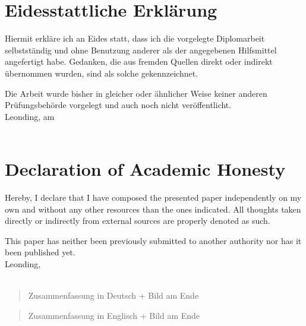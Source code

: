 \section*{Eidesstattliche Erklärung}
Hiermit erkläre ich an Eides statt, dass ich die vorgelegte Diplomarbeit selbstständig und ohne Benutzung anderer als der angegebenen Hilfsmittel angefertigt habe. Gedanken, die aus fremden Quellen direkt oder indirekt übernommen wurden, sind als solche gekennzeichnet.

Die Arbeit wurde bisher in gleicher oder ähnlicher Weise keiner anderen Prüfungsbehörde vorgelegt und auch noch nicht veröffentlicht. \\[1em]
Leonding, am \duedatede \\[5em]
\ifthenelse{\isundefined{\firstauthor}}{}{\firstauthor}
\ifthenelse{\isundefined{\secondauthor}}{}{\kern-1ex, \secondauthor}
\ifthenelse{\isundefined{\thirdauthor}}{}{\kern-1ex, \thirdauthor}
\ifthenelse{\isundefined{\fourthauthor}}{}{\kern-1ex, \fourthauthor} \\[5em]

\section*{Declaration of Academic Honesty}
Hereby, I declare that I have composed the presented paper independently on my own and without any other resources than the ones indicated. All thoughts taken directly or indirectly from external sources are properly denoted as such.

This paper has neither been previously submitted to another authority nor has it been published yet. \\[1em]
Leonding, \duedateen \\[5em]
\ifthenelse{\isundefined{\firstauthor}}{}{\firstauthor}
\ifthenelse{\isundefined{\secondauthor}}{}{\kern-1ex, \secondauthor}
\ifthenelse{\isundefined{\thirdauthor}}{}{\kern-1ex, \thirdauthor}
\ifthenelse{\isundefined{\fourthauthor}}{}{\kern-1ex, \fourthauthor} \\[5em]

\begin{abstract}
	Zusammenfassung in Deutsch + Bild am Ende
\end{abstract}

\begin{otherlanguage}{english}
\begin{abstract}
	Zusammenfassung in Englisch + Bild am Ende
\end{abstract}
\end{otherlanguage}
